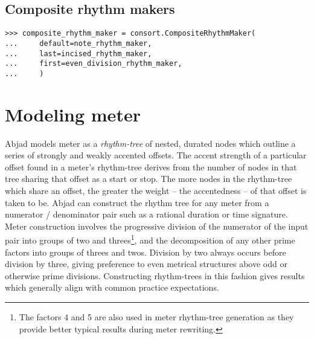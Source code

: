 \subsection{Composite rhythm makers} %

\begin{comment}
<abjad>
composite_rhythm_maker = consort.CompositeRhythmMaker(
    default=note_rhythm_maker,
    last=incised_rhythm_maker,
    first=even_division_rhythm_maker,
    )
</abjad>
\end{comment}

\begin{singlespacing}
\vspace{-0.5\baselineskip}
\begin{lstlisting}
>>> composite_rhythm_maker = consort.CompositeRhythmMaker(
...     default=note_rhythm_maker,
...     last=incised_rhythm_maker,
...     first=even_division_rhythm_maker,
...     )
\end{lstlisting}
\end{singlespacing}

\section{Modeling meter}

Abjad models meter as a \emph{rhythm-tree} of nested, durated nodes which
outline a series of strongly and weakly accented offsets. The accent strength
of a particular offset found in a meter's rhythm-tree derives from the number
of nodes in that tree sharing that offset as a start or stop. The more nodes in
the rhythm-tree which share an offset, the greater the weight -- the
accentedness -- of that offset is taken to be. Abjad can construct the rhythm
tree for any meter from a numerator / denominator pair such as a rational
duration or time signature. Meter construction involves the progressive
division of the numerator of the input pair into groups of two and
threes\footnote{The factors 4 and 5 are also used in meter rhythm-tree
generation as they provide better typical results during meter rewriting.}, and
the decomposition of any other prime factors into groups of threes and twos.
Division by two always occurs before division by three, giving preference to
even metrical structures above odd or otherwise prime divisions. Constructing
rhythm-trees in this fashion gives results which generally align with common
practice expectations.

